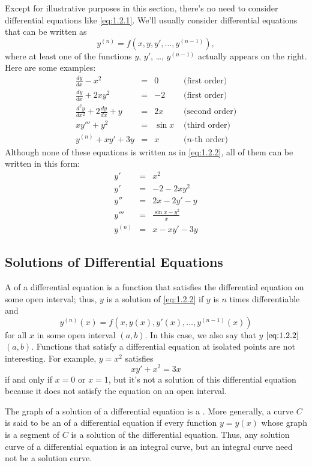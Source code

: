 \documentclass{ximera}
\begin{document}
Except for illustrative purposes in this section, there's no need to
consider differential equations like \eqref{eq:1.2.1}.  We'll
usually consider differential equations that can be written as
\begin{equation} \label{eq:1.2.2}
y^{(n)}=f(x,y,y', \dots,y^{(n-1)}),
\end{equation}
where at least one of the functions $y$, $y'$, \dots, $y^{(n-1)}$ actually
appears on the right. Here are some examples:
$$
\begin{array}{rcll}
\frac{dy}{dx}-x^2&=&0&\mbox{ (first order)}  \\
\frac{dy}{dx}+2xy^2&=&-2&\mbox{ (first order)}   \\
\frac{d^2y}{dx^2}+2\frac{dy}{dx}+y&=&2x&\mbox{ (second order)}
\\
xy'''+y^2&=&\sin x  &\mbox{ (third order)}
\\
y^{(n)}+xy'+3y&=&x&\mbox{ ($n$-th order)}
\end{array}
$$
Although none of these equations is  written as in
\eqref{eq:1.2.2}, all of them can be written in this form:
$$
\begin{array}{rcl}
y'&=&x^2  \\
y'&=&-2-2xy^2   \\
y''&=&2x-2y'-y  \\
y'''&=&\frac{\sin x-y^2}{x}
\\ y^{(n)}&=&x-xy'-3y
\end{array}
$$

\subsection*{Solutions of Differential Equations}

A  of a differential equation is a function that
satisfies the differential equation on some open interval;   thus, $y$
is a solution of \eqref{eq:1.2.2} if $y$ is $n$ times differentiable and
$$
y^{(n)}(x)=f(x,y(x),y'(x), \dots,y^{(n-1)}(x))
$$
for all $x$ in some open interval $(a,b)$. In this case, we also say
that $y$  $\eqref{eq:1.2.2}$  $(a,b)$. Functions
that satisfy a differential equation at isolated points are not
interesting. For example, $y=x^2$ satisfies
$$
xy'+x^2=3x
$$
if and only if $x=0$ or $x=1$, but it's not a solution of this
differential equation because it does not satisfy the equation on an
open interval.

The graph of a solution of a differential equation is  a . More generally, a curve $C$ is said to be an  of a differential equation if every function
$y=y(x)$ whose graph is a segment of $C$ is a solution of the
differential equation. Thus, any solution curve of a differential
equation is an integral curve, but an integral curve need not be a
solution curve.
\end{document}
